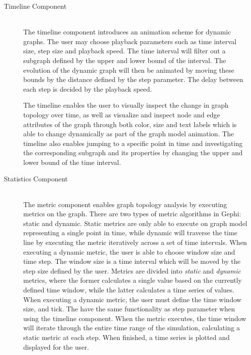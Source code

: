 \begin{description}
\item[Timeline Component] \hfill \\

    The timeline component introduces an animation scheme for dynamic
    graphs. The user may choose playback parameters such as time
    interval size, step size and playback speed. The time interval will
    filter out a subgraph defined by the upper and lower bound of the
    interval. The evolution of the dynamic graph will then be animated
    by moving these bounds by the distance defined by the step
    parameter. The delay between each step is decided by the playback
    speed.

    The timeline enables the user to visually inspect the change in
    graph topology over time, as well as visualize and inspect node and
    edge attributes of the graph through both color, size and text
    labels which is able to change dynamically as part of the graph
    model animation. The timeline also enables jumping to a specific
    point in time and investigating the corresponding subgraph and its
    properties by changing the upper and lower bound of the time
    interval.

\item[Statistics Component] \hfill \\

    The metric component enables graph topology analysis by executing
    metrics on the graph. There are two types of metric algorithms in Gephi:
    static and dynamic. Static metrics are only able to execute on graph
    model representing a single point in time, while dynamic will traverse
    the time line by executing the metric iteratively across a set of time
    intervals. When executing a dynamic metric, the user is able to choose
    window size and time step. The window size is a time interval which will
    be moved by the step size defined by the user. Metrics are divided
    into \emph{static} and \emph{dynamic} metrics, where the former
    calculates a single value based on the currently defined time
    window, while the latter calculates a time series of values. When
    executing a dynamic metric, the user must define the time window
    size, and tick. The have the same functionality as step parameter
    when using the timeline component. When the metric executes,
    the time window will iterate through the entire time range of the
    simulation, calculating a static metric at each step. When finished,
    a time series is plotted and displayed for the user.


\end{description}

